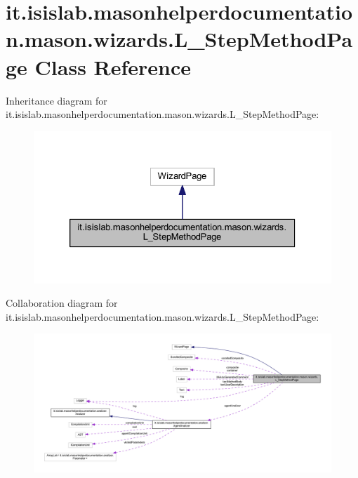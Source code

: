 \hypertarget{classit_1_1isislab_1_1masonhelperdocumentation_1_1mason_1_1wizards_1_1_l___step_method_page}{\section{it.\-isislab.\-masonhelperdocumentation.\-mason.\-wizards.\-L\-\_\-\-Step\-Method\-Page Class Reference}
\label{classit_1_1isislab_1_1masonhelperdocumentation_1_1mason_1_1wizards_1_1_l___step_method_page}
}


Inheritance diagram for it.\-isislab.\-masonhelperdocumentation.\-mason.\-wizards.\-L\-\_\-\-Step\-Method\-Page\-:
\nopagebreak
\begin{figure}[H]
\begin{center}
\leavevmode
\includegraphics[width=326pt]{classit_1_1isislab_1_1masonhelperdocumentation_1_1mason_1_1wizards_1_1_l___step_method_page__inherit__graph}
\end{center}
\end{figure}


Collaboration diagram for it.\-isislab.\-masonhelperdocumentation.\-mason.\-wizards.\-L\-\_\-\-Step\-Method\-Page\-:
\nopagebreak
\begin{figure}[H]
\begin{center}
\leavevmode
\includegraphics[width=350pt]{classit_1_1isislab_1_1masonhelperdocumentation_1_1mason_1_1wizards_1_1_l___step_method_page__coll__graph}
\end{center}
\end{figure}

